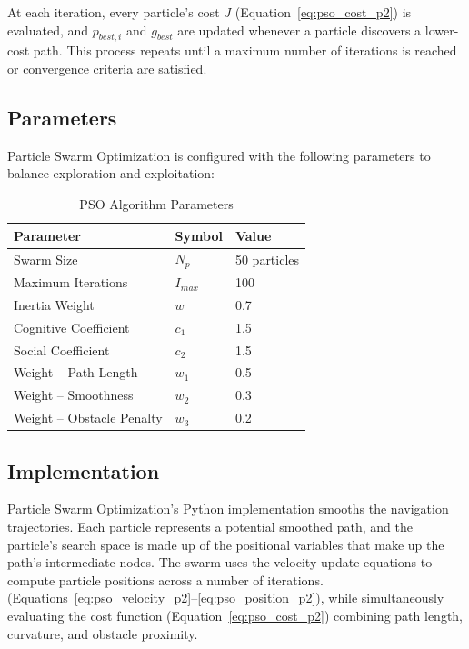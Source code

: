 At each iteration, every particle's cost $J$ (Equation~\ref{eq:pso_cost_p2}) is evaluated, and $p_{best,i}$ and $g_{best}$ are updated whenever a particle discovers a lower-cost path. This process repeats until a maximum number of iterations is reached or convergence criteria are satisfied.

\subsection{Parameters}
\label{subsec:pso_parameters}

Particle Swarm Optimization is configured with the following parameters to balance exploration and exploitation:

\begin{table}[H]
	\centering
	\caption{PSO Algorithm Parameters}
	\label{tab:pso_parameters_p2}
	\begin{tabular}{|p{6cm}|p{2cm}|p{2cm}|}
		\hline
		\textbf{Parameter} & \textbf{Symbol} & \textbf{Value} \\
		\hline
		Swarm Size & $N_p$ & 50 particles \\
		\hline
		Maximum Iterations & $I_{max}$ & 100 \\
		\hline
		Inertia Weight & $w$ & 0.7 \\
		\hline
		Cognitive Coefficient & $c_1$ & 1.5 \\
		\hline
		Social Coefficient & $c_2$ & 1.5 \\
		\hline
		Weight -- Path Length & $w_1$ & 0.5 \\
		\hline
		Weight -- Smoothness & $w_2$ & 0.3 \\
		\hline
		Weight -- Obstacle Penalty & $w_3$ & 0.2 \\
		\hline
	\end{tabular}
\end{table}

\subsection{Implementation}
\label{subsec:pso_implementation}

Particle Swarm Optimization's Python implementation smooths the navigation trajectories. Each particle represents a potential smoothed path, and the particle's search space is made up of the positional variables that make up the path's intermediate nodes. The swarm uses the velocity update equations to compute particle positions across a number of iterations.
 (Equations~\ref{eq:pso_velocity_p2}--\ref{eq:pso_position_p2}), while simultaneously evaluating the cost function (Equation~\ref{eq:pso_cost_p2}) combining path length, curvature, and obstacle proximity.

